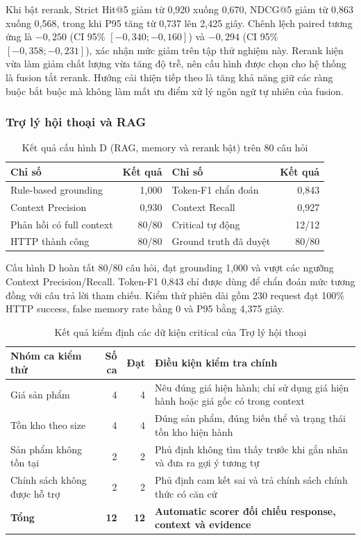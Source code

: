 Khi bật rerank, Strict Hit@5 giảm từ 0,920 xuống 0,670, NDCG@5 giảm từ 0,863 xuống 0,568, trong khi P95 tăng từ 0,737 lên 2,425 giây. Chênh lệch paired tương ứng là $-0{,}250$ (CI 95\% $[-0{,}340; -0{,}160]$) và $-0{,}294$ (CI 95\% $[-0{,}358; -0{,}231]$), xác nhận mức giảm trên tập thử nghiệm này. Rerank hiện vừa làm giảm chất lượng vừa tăng độ trễ, nên cấu hình được chọn cho hệ thống là fusion tắt rerank. Hướng cải thiện tiếp theo là tăng khả năng giữ các ràng buộc bắt buộc mà không làm mất ưu điểm xử lý ngôn ngữ tự nhiên của fusion.

\subsubsection{Trợ lý hội thoại và RAG}
\begin{table}[H]
\centering
\caption{Kết quả cấu hình D (RAG, memory và rerank bật) trên 80 câu hỏi}
\label{tab:rag-results}
\begin{tabularx}{\linewidth}{|X|r|X|r|}
\hline
\textbf{Chỉ số} & \textbf{Kết quả} & \textbf{Chỉ số} & \textbf{Kết quả} \\ \hline
Rule-based grounding & 1,000 & Token-F1 chẩn đoán & 0,843 \\ \hline
Context Precision & 0,930 & Context Recall & 0,927 \\ \hline
Phản hồi có full context & 80/80 & Critical tự động & 12/12 \\ \hline
HTTP thành công & 80/80 & Ground truth đã duyệt & 80/80 \\ \hline
\end{tabularx}
\end{table}

Cấu hình D hoàn tất 80/80 câu hỏi, đạt grounding 1,000 và vượt các ngưỡng Context Precision/Recall. Token-F1 0,843 chỉ được dùng để chẩn đoán mức tương đồng với câu trả lời tham chiếu. Kiểm thử phiên dài gồm 230 request đạt 100\% HTTP success, false memory rate bằng 0 và P95 bằng 4,375 giây.
\begin{table}[H]
\centering
\caption{Kết quả kiểm định các dữ kiện critical của Trợ lý hội thoại}
\label{tab:conversational-critical-gates}
\begin{tabularx}{\linewidth}{|X|r|r|X|}
\hline
\textbf{Nhóm ca kiểm thử} & \textbf{Số ca} & \textbf{Đạt} & \textbf{Điều kiện kiểm tra chính} \\ \hline
Giá sản phẩm & 4 & 4 & Nêu đúng giá hiện hành; chỉ sử dụng giá hiện hành hoặc giá gốc có trong context \\ \hline
Tồn kho theo size & 4 & 4 & Đúng sản phẩm, đúng biến thể và trạng thái tồn kho hiện hành \\ \hline
Sản phẩm không tồn tại & 2 & 2 & Phủ định không tìm thấy trước khi gắn nhãn và đưa ra gợi ý tương tự \\ \hline
Chính sách không được hỗ trợ & 2 & 2 & Phủ định cam kết sai và trả chính sách chính thức có căn cứ \\ \hline
\textbf{Tổng} & \textbf{12} & \textbf{12} & \textbf{Automatic scorer đối chiếu response, context và evidence} \\ \hline
\end{tabularx}
\end{table}

